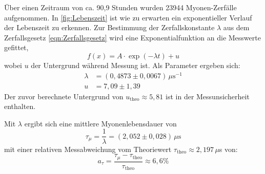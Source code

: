         \FloatBarrier

        Über einen Zeitraum von ca. 90,9 Stunden wurden 23944 Myonen-Zerfälle aufgenommen. In \autoref{fig:Lebenszeit} ist wie zu erwarten ein exponentieller Verlauf der Lebenszeit zu erkennen. Zur Bestimmung der Zerfallskonstante $\lambda$ aus dem Zerfallsgesetz \eqref{eqn:Zerfallsgesetz} wird eine Exponentialfunktion an die Messwerte gefittet,
        \begin{equation*}
            f(x) = A \cdot \exp\left(-\lambda t\right) + u
        \end{equation*}
        wobei $u$ der Untergrund während Messung ist. Als Parameter ergeben sich:
        \begin{align*}
            \lambda &= (0,4873 \pm 0,0067) \, \mu\text{s}^{-1} \\
            u &= 7,09 \pm 1,39
        \end{align*}
        Der zuvor berechnete Untergrund von $u_{\text{theo}} \approx 5,81$ ist in der Messunsicherheit enthalten.

        Mit $\lambda$ ergibt sich eine mittlere Myonenlebensdauer von
        \begin{equation*}
            \tau_{\mu} = \frac{1}{\lambda} = (2,052 \pm 0,028) \, \mu\text{s}
        \end{equation*}
        mit einer relativen Messabweichung vom Theoriewert $\tau_{\text{theo}} \approx 2,197 \, \mu$s von:
        \begin{equation*}
            a_{\tau} = \frac{\tau_{\mu} - \tau_{\text{theo}}}{\tau_{\text{theo}}} \approx 6,6 \%
        \end{equation*}


















































